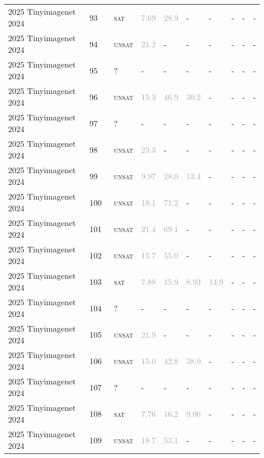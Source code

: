 \begin{center}
{\begin{longtable}{@{}llllllllll@{}}
2025 Tinyimagenet 2024 & 93 & ~\textsc{sat} & \textcolor{darkgray}{7.69} & \textcolor{darkgray}{28.9} & - & - & - & - & - \\
2025 Tinyimagenet 2024 & 94 & ~\textsc{unsat} & \textcolor{darkgray}{21.2} & - & - & - & - & - & - \\
2025 Tinyimagenet 2024 & 95 & ~? & - & - & - & - & - & - & - \\
2025 Tinyimagenet 2024 & 96 & ~\textsc{unsat} & \textcolor{darkgray}{15.3} & \textcolor{darkgray}{46.9} & \textcolor{darkgray}{30.2} & - & - & - & - \\
2025 Tinyimagenet 2024 & 97 & ~? & - & - & - & - & - & - & - \\
2025 Tinyimagenet 2024 & 98 & ~\textsc{unsat} & \textcolor{darkgray}{23.3} & - & - & - & - & - & - \\
2025 Tinyimagenet 2024 & 99 & ~\textsc{unsat} & \textcolor{darkgray}{9.97} & \textcolor{darkgray}{28.0} & \textcolor{darkgray}{13.4} & - & - & - & - \\
2025 Tinyimagenet 2024 & 100 & ~\textsc{unsat} & \textcolor{darkgray}{18.1} & \textcolor{darkgray}{71.2} & - & - & - & - & - \\
2025 Tinyimagenet 2024 & 101 & ~\textsc{unsat} & \textcolor{darkgray}{21.4} & \textcolor{darkgray}{69.1} & - & - & - & - & - \\
2025 Tinyimagenet 2024 & 102 & ~\textsc{unsat} & \textcolor{darkgray}{15.7} & \textcolor{darkgray}{55.0} & - & - & - & - & - \\
2025 Tinyimagenet 2024 & 103 & ~\textsc{sat} & \textcolor{darkgray}{7.88} & \textcolor{darkgray}{15.9} & \textcolor{darkgray}{8.93} & \textcolor{darkgray}{14.9} & - & - & - \\
2025 Tinyimagenet 2024 & 104 & ~? & - & - & - & - & - & - & - \\
2025 Tinyimagenet 2024 & 105 & ~\textsc{unsat} & \textcolor{darkgray}{21.9} & - & - & - & - & - & - \\
2025 Tinyimagenet 2024 & 106 & ~\textsc{unsat} & \textcolor{darkgray}{15.0} & \textcolor{darkgray}{42.8} & \textcolor{darkgray}{38.0} & - & - & - & - \\
2025 Tinyimagenet 2024 & 107 & ~? & - & - & - & - & - & - & - \\
2025 Tinyimagenet 2024 & 108 & ~\textsc{sat} & \textcolor{darkgray}{7.76} & \textcolor{darkgray}{16.2} & \textcolor{darkgray}{9.06} & - & - & - & - \\
2025 Tinyimagenet 2024 & 109 & ~\textsc{unsat} & \textcolor{darkgray}{18.7} & \textcolor{darkgray}{53.1} & - & - & - & - & - \\

\end{longtable}}
\end{center}
